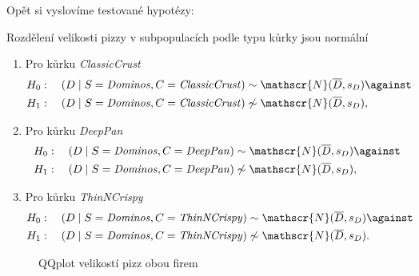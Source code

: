 Opět si vyslovíme testované hypotézy:

\begin{hypothesis}
	\label{hyp:normalita_rozdeleni_velikosti_pizz_pro_firmu_dominos_v_subpopulacich_podle_typu_kurky}
	Rozdělení velikosti pizzy v subpopulacích podle typu kůrky jsou normální
	\begin{enumerate}[label=(\alph*)]
		\item Pro kůrku \emph{ClassicCrust}
		      \label{hyp:normalita_rozdeleni_velikosti_pizz_pro_firmu_dominos_v_subpopulacich_podle_typu_kurky_a}
		      \[
			      \begin{split}
				      &H_0: \quad (D \mid S = \text{\emph{Dominos}}, C = \text{\emph{ClassicCrust}}) \sim
				      \mathscr{N}(\overline{D}, s_D)  \against \\
				      &H_1: \quad (D \mid S =
				      \text{\emph{Dominos}}, C = \text{\emph{ClassicCrust}}) \not\sim
				      \mathscr{N}(\overline{D}, s_D),
			      \end{split}
		      \]
		\item Pro kůrku \emph{DeepPan}
		      \label{hyp:normalita_rozdeleni_velikosti_pizz_pro_firmu_dominos_v_subpopulacich_podle_typu_kurky_b}
		      \[
			      \begin{split}
				      &H_0: \quad (D \mid S = \text{\emph{Dominos}}, C = \text{\emph{DeepPan}}) \sim
				      \mathscr{N}(\overline{D}, s_D) \against\\
				      &H_1: \quad (D \mid S = \text{\emph{Dominos}}, C = \text{\emph{DeepPan}}) \not\sim \mathscr{N}(\overline{D},
				      s_D),
			      \end{split}
		      \]
		\item Pro kůrku \emph{ThinNCrispy}
		      \label{hyp:normalita_rozdeleni_velikosti_pizz_pro_firmu_dominos_v_subpopulacich_podle_typu_kurky_c}
		      \[
			      \begin{split}
				      &H_0: \quad (D \mid S = \text{\emph{Dominos}}, C = \text{\emph{ThinNCrispy}}) \sim
				      \mathscr{N}(\overline{D}, s_D) \against\\
				      &H_1: \quad (D \mid S = \text{\emph{Dominos}}, C = \text{\emph{ThinNCrispy}})
				      \not\sim \mathscr{N}(\overline{D}, s_D).
			      \end{split}
		      \]
	\end{enumerate}
\end{hypothesis}

\begin{figure}[H]

	\centering
	\label{fig:qqplots_stores}
	
	\caption{QQplot velikostí pizz obou firem}
\end{figure}


